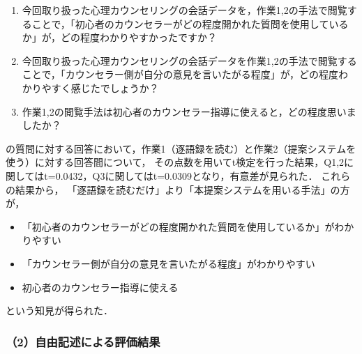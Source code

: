 \documentclass[shuuron]{kuee}
\begin{document}
\begin{enumerate}

  \item 今回取り扱った心理カウンセリングの会話データを，作業1,2の手法で閲覧することで，「初心者のカウンセラーがどの程度開かれた質問を使用しているか」が，どの程度わかりやすかったですか？
  \item 今回取り扱った心理カウンセリングの会話データを作業1,2の手法で閲覧することで，「カウンセラー側が自分の意見を言いたがる程度」が，どの程度わかりやすく感じたでしょうか？
  \item 作業1,2の閲覧手法は初心者のカウンセラー指導に使えると，どの程度思いましたか？
\end{enumerate}
の質問に対する回答において，作業1（逐語録を読む）と作業2（提案システムを使う）に対する回答間について，
その点数を用いてt検定を行った結果，Q1,2に関してはt=0.0432，Q3に関してはt=0.0309となり，有意差が見られた．
これらの結果から，
「逐語録を読むだけ」より「本提案システムを用いる手法」の方が，
\begin{itemize}
  \item 「初心者のカウンセラーがどの程度開かれた質問を使用しているか」がわかりやすい
  \item 「カウンセラー側が自分の意見を言いたがる程度」がわかりやすい
  \item 初心者のカウンセラー指導に使える
\end{itemize}
という知見が得られた．


\subsubsection{（2）自由記述による評価結果}
%
%
%
%
%




\end{document}
